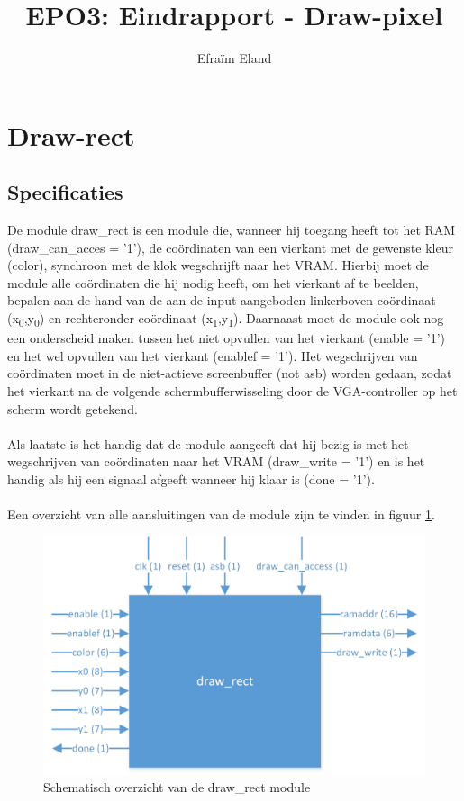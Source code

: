 \documentclass{scrartcl} %
\author{Efraïm Eland}%
\title{EPO3: Eindrapport - Draw-pixel}
\begin{document}
\section{Draw-rect} %
\label{sec:draw-rect}  %

\newcommand{\tss}{\textsubscript}

\subsection{Specificaties}
De module draw\_rect is een module die, wanneer hij toegang heeft tot het RAM (draw\_can\_acces = '1'), de coördinaten van een vierkant met de gewenste kleur (color), synchroon met de klok wegschrijft naar het VRAM. Hierbij moet de module alle coördinaten die hij nodig heeft, om het vierkant af te beelden, bepalen aan de hand van de aan de input aangeboden linkerboven coördinaat (x\tss{0},y\tss{0}) en rechteronder coördinaat (x\tss{1},y\tss{1}). Daarnaast moet de module ook nog een onderscheid maken tussen het niet opvullen van het vierkant (enable = '1') en het wel opvullen van het vierkant (enablef = '1'). Het wegschrijven van coördinaten moet in de niet-actieve screenbuffer (not asb) worden gedaan, zodat het vierkant na de volgende schermbufferwisseling door de VGA-controller op het scherm wordt getekend.
\\\\
Als laatste is het handig dat de module aangeeft dat hij bezig is met het wegschrijven van coördinaten naar het VRAM (draw\_write = '1') en is het handig als hij een signaal afgeeft wanneer hij klaar is (done = '1').
\\\\
Een overzicht van alle aansluitingen van de module zijn te vinden in figuur \ref{fig:draw_rect}.

\begin{figure}[H]
	\centering
	\includegraphics[width=\textwidth]{resources/draw_rect.png}
	\caption{Schematisch overzicht van de draw\_rect module}
	\label{fig:draw_rect}
\end{figure}
\end{document}
